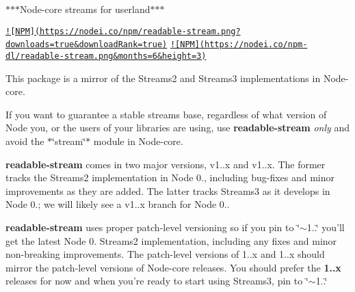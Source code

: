 $\ast$$\ast$$\ast$\+Node-\/core streams for userland$\ast$$\ast$$\ast$

\href{https://nodei.co/npm/readable-stream/}{\tt !\mbox{[}N\+P\+M\mbox{]}(https\+://nodei.\+co/npm/readable-\/stream.\+png?downloads=true\&download\+Rank=true)} \href{https://nodei.co/npm/readable-stream/}{\tt !\mbox{[}N\+P\+M\mbox{]}(https\+://nodei.\+co/npm-\/dl/readable-\/stream.\+png\&months=6\&height=3)}

This package is a mirror of the Streams2 and Streams3 implementations in Node-\/core.

If you want to guarantee a stable streams base, regardless of what version of Node you, or the users of your libraries are using, use {\bfseries readable-\/stream} {\itshape only} and avoid the $\ast$\char`\"{}stream\char`\"{}$\ast$ module in Node-\/core.

{\bfseries readable-\/stream} comes in two major versions, v1..\+x and v1..\+x. The former tracks the Streams2 implementation in Node 0., including bug-\/fixes and minor improvements as they are added. The latter tracks Streams3 as it develops in Node 0.; we will likely see a v1..\+x branch for Node 0..

{\bfseries readable-\/stream} uses proper patch-\/level versioning so if you pin to {\ttfamily \char`\"{}$\sim$1..\char`\"{}} you’ll get the latest Node 0. Streams2 implementation, including any fixes and minor non-\/breaking improvements. The patch-\/level versions of 1..\+x and 1..\+x should mirror the patch-\/level versions of Node-\/core releases. You should prefer the {\bfseries 1..\+x} releases for now and when you’re ready to start using Streams3, pin to {\ttfamily \char`\"{}$\sim$1..\char`\"{}} 
